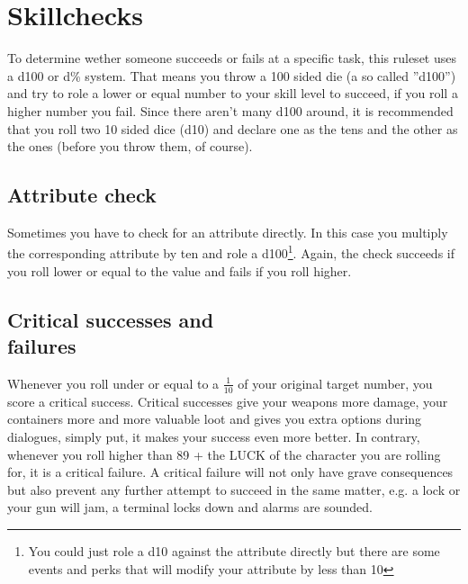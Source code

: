 \section{Skillchecks}
To determine wether someone succeeds or fails at a specific task, this ruleset uses a d100 or d\% system. That means you throw a 100 sided die (a so called ''d100'') and try to role a lower or equal number to your skill level to succeed, if you roll a higher number you fail. Since there aren't many d100 around, it is recommended that you roll two 10 sided dice (d10) and declare one as the tens and the other as the ones (before you throw them, of course).
\subsection{Attribute check}
Sometimes you have to check for an attribute directly. In this case you multiply the corresponding attribute by ten and role a d100\footnote{You could just role a d10 against the attribute directly but there are some events and perks that will modify your attribute by less than 10}. Again, the check succeeds if you roll lower or equal to the value and fails  if you roll higher.
\subsection{Critical successes and \\failures}
Whenever you roll under or equal to a $\frac{1}{10}$ of your original target number, you score a critical success. Critical successes give your weapons more damage, your containers more and more valuable loot and gives you extra options during dialogues, simply put, it makes your success even more better.
In contrary, whenever you roll higher than 89 + the LUCK of the character you are rolling for, it is a critical failure. A critical failure will not only have grave consequences but also prevent any further attempt to succeed in the same matter, e.g. a lock or your gun will jam, a terminal locks down and alarms are sounded.